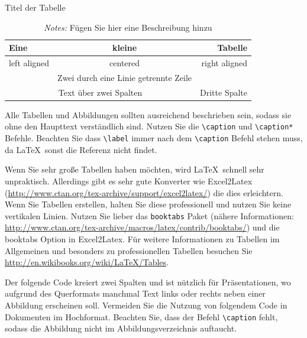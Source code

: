 \documentclass[a4paper,12pt]{scrartcl} %
\begin{document}
\begin{table}
\caption[Titel für Inhaltsverzeichnis]{Titel der Tabelle}
\label{tab:Table1}
\centering
 \begin{tabular}{lcr}
   Eine & kleine  & Tabelle\\
\toprule
   left aligned & centered & right aligned \\
   & Zwei durch eine Linie getrennte Zeile  & \\
\cmidrule{2-3}
   \multicolumn{2}{c}{Text über zwei Spalten} & Dritte Spalte \\
\bottomrule
\end{tabular}
\caption*{\footnotesize{\emph{Notes:} Fügen Sie hier eine Beschreibung hinzu}} %
\end{table}

Alle Tabellen und Abbildungen sollten ausreichend beschrieben sein, sodass sie ohne den Haupttext verständlich sind. Nutzen Sie die \verb|\caption| und \verb|\caption*| Befehle. Beachten Sie dass \verb|\label| immer nach dem \verb|\caption| Befehl stehen muss, da \LaTeX\ sonst die Referenz nicht findet.

Wenn Sie sehr große Tabellen haben möchten, wird \LaTeX\ schnell sehr unpraktisch. Allerdings gibt es sehr gute Konverter wie Excel2Latex (\url{http://www.ctan.org/tex-archive/support/excel2latex/}) die dies erleichtern. Wenn Sie Tabellen erstellen, halten Sie diese professionell und nutzen Sie keine vertikalen Linien. Nutzen Sie lieber das \texttt{booktabs} Paket (nähere Informationen: \url{http://www.ctan.org/tex-archive/macros/latex/contrib/booktabs/}) und die booktabs Option in Excel2Latex. Für weitere Informationen zu Tabellen im Allgemeinen und besonders zu professionellen Tabellen besuchen Sie \url{http://en.wikibooks.org/wiki/LaTeX/Tables}.

Der folgende Code kreiert zwei Spalten und ist nützlich für Präsentationen, wo aufgrund des Querformats manchmal Text links oder rechts neben einer Abbildung erscheinen soll. Vermeiden Sie die Nutzung von folgendem Code in Dokumenten im Hochformat. Beachten Sie, dass der Befehl \verb|\caption| fehlt, sodass die Abbildung nicht im Abbildungsverzeichnis auftaucht.
\end{document}
